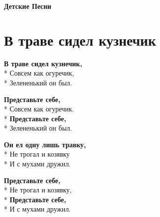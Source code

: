 \cleardoublepage
\thispagestyle{empty}
\vspace*{\fill}
{\centering\huge\bfseries Детские Песни\par}
\vspace*{\fill}
\newpage
\section{В траве сидел кузнечик}
\label{song:В_траве_сидел_кузнечик}

\begin{minipage}{\linewidth}
\textbf{В траве сидел кузнечик,}\\*
Совсем как огуречик,\\*
Зелененький он был.\\
\end{minipage}\par\medskip\nobreak

\medskip

\begin{minipage}{\linewidth}
\hspace*{1.5em}\textbf{Представьте себе,}\\*
\hspace*{1.5em}Совсем как огуречик.\\*
\hspace*{1.5em}\textbf{Представьте себе,}\\*
\hspace*{1.5em}Зелененький он был.\\
\end{minipage}\par\medskip\nobreak

\medskip

\begin{minipage}{\linewidth}
\textbf{Он ел одну лишь травку,}\\*
Не трогал и козявку\\*
И с мухами дружил.\\
\end{minipage}\par\medskip\nobreak

\medskip

\begin{minipage}{\linewidth}
\hspace*{1.5em}\textbf{Представьте себе,}\\*
\hspace*{1.5em}Не трогал и козявку,\\*
\hspace*{1.5em}\textbf{Представьте себе,}\\*
\hspace*{1.5em}И с мухами дружил.\\
\end{minipage}\par\medskip\nobreak

